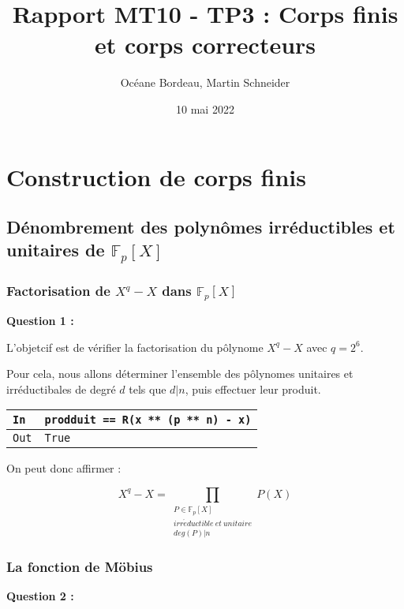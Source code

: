\documentclass[titlepage]{article}
\title{Rapport MT10 - TP3 : Corps finis et corps correcteurs}
\author{Océane Bordeau, Martin Schneider}
\date{10 mai 2022}
\begin{document}
    \maketitle
    \tableofcontents
    \pagebreak

    \section{Construction de corps finis}
        \setcounter{subsection}{2}
        \subsection{Dénombrement des polynômes irréductibles et unitaires de $\mathbb{F}_p[X]$}
            \subsubsection{Factorisation de $X^q-X$ dans $\mathbb{F}_p[X]$}
            \textbf{Question 1 :}

            L'objetcif est de vérifier la factorisation du pôlynome $X^q-X$ avec $q=2^6$.

            Pour cela, nous allons déterminer l'ensemble des pôlynomes unitaires et irréductibales de degré $d$ tels que $d|n$, puis effectuer leur produit.

            

            \begin{tabularx}{12cm}{|p{0.60cm}|X|}
                \hline
                \rowcolor{gray}
                \texttt{In}
                & 
                \texttt{prodduit == R(x ** (p ** n) - x)}
                \\
                \hline
                \texttt{Out}
                &
                \texttt{True}
                \\
                \hline
            \end{tabularx}
            \bigbreak

            On peut donc affirmer :

            \[ X^q-X=\prod_{\substack{P \in \mathbb{F}_p[X] \\ irr\acute{e}ductible \: et \: unitaire  \\ deg(P)|n}} P(X) \]

            \subsubsection{La fonction de Möbius}
            \textbf{Question 2 :}
\end{document}
